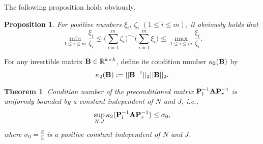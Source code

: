 \documentclass[11pt]{article}%
\numberwithin{equation}{section}
\newtheorem{theorem}{Theorem}
\newtheorem{proposition}{Proposition}
\begin{document}
The following proposition holds obviously.
\begin{proposition}\label{wghtsumbdlem}
	For positive numbers $\xi_i$, $\zeta_i$ $(1\leq i\leq m)$,
	it obviously holds that
	\begin{equation*}
	\min\limits_{1\leq i\leq m}\frac{\xi_i}{\zeta_i}\leq\bigg(\sum\limits_{i=1}^{m}\zeta_i\bigg)^{-1}\bigg(\sum\limits_{i=1}^{m}\xi_i\bigg)\leq\max\limits_{1\leq i\leq m}\frac{\xi_i}{\zeta_i}.
	\end{equation*}
\end{proposition}

For any invertible matrix ${\bf B}\in\mathbb{R}^{k\times k}$, define its condition number $\kappa_2({\bf B})$ by $$\kappa_2({\bf B}):=||{\bf B}^{-1}||_2||{\bf B}||_2.$$

\begin{theorem}\label{mainthm}
	Condition number of the preconditioned matrix ${\bf P}_l^{-1}{\bf A}{\bf P}_r^{-1}$ is uniformly bounded by a constant independent of $N$ and $J$, i.e.,
	\begin{equation*}
	\sup\limits_{N,J}\kappa_2({\bf P}_l^{-1}{\bf A}{\bf P}_r^{-1})\leq \sigma_0,
	\end{equation*}
	where $\sigma_0=\frac{\hat{a}}{\check{a}}$ is a positive constant independent of $N$ and $J$.
\end{theorem}
\end{document}
